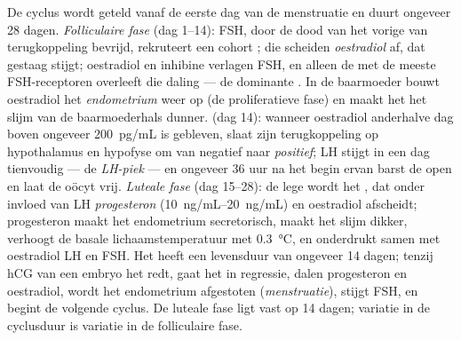\begin{definition}\label{def:b2:reproductive-hormones:cycle}
De cyclus wordt geteld vanaf de eerste dag van de menstruatie en duurt
ongeveer 28 dagen. \emph{Folliculaire fase} (dag 1--14): FSH, door de dood
van het vorige  van terugkoppeling bevrijd, rekruteert een
cohort ; die scheiden \emph{oestradiol} af, dat gestaag stijgt;
oestradiol en inhibine verlagen FSH, en alleen de  met de meeste
FSH-receptoren overleeft die daling --- de dominante . In de
baarmoeder bouwt oestradiol het \emph{endometrium} weer op (de
proliferatieve fase) en maakt het het slijm van de baarmoederhals dunner.
\emph{} (dag 14): wanneer oestradiol anderhalve dag boven ongeveer
\qty{200}{pg/mL} is gebleven, slaat zijn terugkoppeling op hypothalamus en
hypofyse om van negatief naar \emph{positief}; LH stijgt in een dag
tienvoudig --- de \emph{LH-piek} --- en ongeveer 36 uur na het begin ervan
barst de  open en laat de oöcyt vrij. \emph{Luteale fase} (dag
15--28): de lege  wordt het , dat onder invloed van LH
\emph{progesteron} (\qtyrange{10}{20}{ng/mL}) en oestradiol afscheidt;
progesteron maakt het endometrium secretorisch, maakt het slijm dikker,
verhoogt de basale lichaamstemperatuur met \qty{0.3}{\celsius}, en
onderdrukt samen met oestradiol LH en FSH. Het  heeft een
levensduur van ongeveer 14 dagen; tenzij hCG van een embryo het redt, gaat
het in regressie, dalen progesteron en oestradiol, wordt het endometrium
afgestoten (\emph{menstruatie}), stijgt FSH, en begint de volgende cyclus.
De luteale fase ligt vast op 14 dagen; variatie in de cyclusduur is
variatie in de folliculaire fase.
\end{definition}

